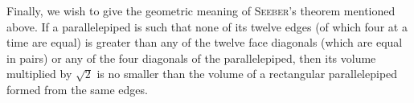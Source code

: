 Finally, we wish to give the geometric meaning of \textsc{Seeber}'s theorem mentioned above. If a parallelepiped is such that none of its twelve edges (of which four at a time are equal) is greater than any of the twelve face diagonals (which are equal in pairs) or any of the four diagonals of the parallelepiped, then its volume multiplied by $\surd2$ is no smaller than the volume of a rectangular parallelepiped formed from the same edges.
